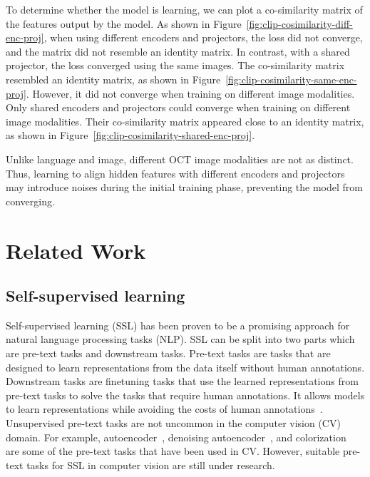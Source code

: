 \documentclass[a4paper,11pt,oneside]{report}
\begin{document}
To determine whether the model is learning, we can plot a co-similarity matrix of the features output by the model. As shown in Figure~\ref{fig:clip-cosimilarity-diff-enc-proj}, when using different encoders and projectors, the loss did not converge, and the matrix did not resemble an identity matrix. In contrast, with a shared projector, the loss converged using the same images. The co-similarity matrix resembled an identity matrix, as shown in Figure~\ref{fig:clip-cosimilarity-same-enc-proj}. However, it did not converge when training on different image modalities. Only shared encoders and projectors could converge when training on different image modalities. Their co-similarity matrix appeared close to an identity matrix, as shown in Figure~\ref{fig:clip-cosimilarity-shared-enc-proj}.

Unlike language and image, different OCT image modalities are not as distinct. Thus, learning to align hidden features with different encoders and projectors may introduce noises during the initial training phase, preventing the model from converging. 
\chapter{Related Work}



\section{Self-supervised learning}
Self-supervised learning (SSL) has been proven to be a promising approach for natural language processing tasks (NLP). SSL can be split into two parts which are pre-text tasks and downstream tasks. Pre-text tasks are tasks that are designed to learn representations from the data itself without human annotations. Downstream tasks are finetuning tasks that use the learned representations from pre-text tasks to solve the tasks that require human annotations. It allows models to learn representations while avoiding the costs of human annotations~\cite{Jaiswal2020}. Unsupervised pre-text tasks are not uncommon in the computer vision (CV) domain. For example, autoencoder~\cite{Hinton2006}, denoising autoencoder~\cite{Vincent2008}, and colorization~\cite{Larsson2017} are some of the pre-text tasks that have been used in CV. However, suitable pre-text tasks for SSL in computer vision are still under research.
\end{document}
